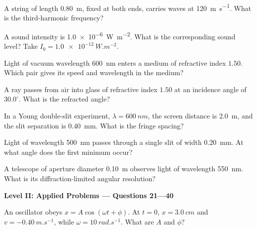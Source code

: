 \documentclass[10pt,a4paper]{physicsquiz}
\newcommand{\levelbanner}[2]{%
\item[]\begin{tcolorbox}[colback=QuizLightBlue,colframe=QuizBlue,boxrule=0.6pt,arc=1.5mm,left=5pt,right=5pt,top=4pt,bottom=4pt]
\centering\textbf{Level #1: #2}
\end{tcolorbox}}
\begin{document}
\begin{quizquestions}[2]
  \item A string of length \SI{0.80}{m}, fixed at both ends, carries waves at \SI{120}{m.s^{-1}}. What is the third-harmonic frequency?
  \item A sound intensity is \SI{1.0e-6}{W.m^{-2}}. What is the corresponding sound level? Take \(I_0=\SI{1.0e-12}{W.m^{-2}}\).
  \item Light of vacuum wavelength \SI{600}{nm} enters a medium of refractive index \(1.50\). Which pair gives its speed and wavelength in the medium?
  \item A ray passes from air into glass of refractive index \(1.50\) at an incidence angle of \(30.0^\circ\). What is the refracted angle?
  \item In a Young double-slit experiment, \(\lambda=\SI{600}{nm}\), the screen distance is \SI{2.0}{m}, and the slit separation is \SI{0.40}{mm}. What is the fringe spacing?
  \item Light of wavelength \SI{500}{nm} passes through a single slit of width \SI{0.20}{mm}. At what angle does the first minimum occur?
  \item A telescope of aperture diameter \SI{0.10}{m} observes light of wavelength \SI{550}{nm}. What is its diffraction-limited angular resolution?
  \levelbanner{II}{Applied Problems — Questions 21—40}
  \item An oscillator obeys \(x=A\cos(\omega t+\phi)\). At \(t=0\), \(x=\SI{3.0}{cm}\) and \(v=\SI{-0.40}{m.s^{-1}}\), while \(\omega=\SI{10}{rad.s^{-1}}\). What are \(A\) and \(\phi\)?

\end{quizquestions}
\end{document}
